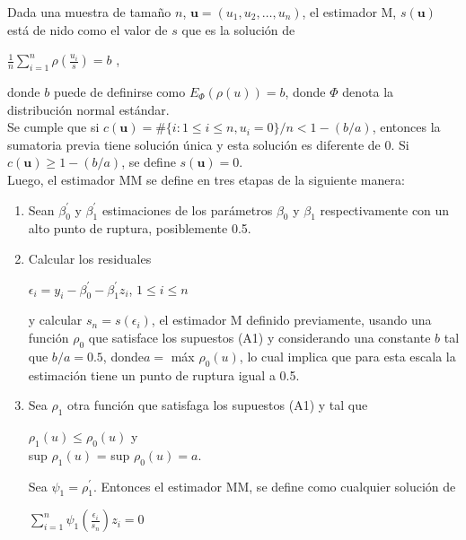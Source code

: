 Dada una muestra de tamaño $n$, $ \mathbf{u} = (u_{1}, u_{2}, \dots , u_{n})$,  el estimador M, $s(\mathbf{u})$ está de nido como el valor de $s$ que es la solución de\\

\begin{center}
	{\Large	$\frac{1}{n} \sum_{i=1}^{n} \rho( \frac{u_{i}}{s}) = b$ },\\
\end{center}

donde $b$ puede de definirse como $E_{\Phi}(\rho(u)) = b$, donde $\Phi$ denota la distribución normal estándar.\\

Se cumple que si $c(\mathbf{u}) = \#\{i : 1 \leq i \leq n, u_{i}=0\} / n < 1- (b/a) $, entonces la sumatoria previa tiene solución única y esta solución es diferente de 0. Si $c(\mathbf{u}) \geq 1 -  (b/a)$, se define $s(\mathbf{u}) = 0$. \\

Luego, el estimador MM se define en tres etapas de la siguiente manera:\\

\begin{enumerate}
	\item Sean $ \beta_{0}^{'}$ y $ \beta_{1}^{'}$ estimaciones de los parámetros $\beta_{0}$ y $ \beta_{1}$ respectivamente con un alto punto de ruptura, posiblemente 0.5.
	\item  Calcular los residuales\\
	\begin{center}
		 $ \epsilon_{i} = y_{i} -\beta_{0}^{'} -\beta_{1}^{'} z_{i}  $, $1 \leq i \leq n $\\
	\end{center}
	
	y calcular $s_{n} = s(\epsilon_{i})$, el estimador M definido previamente, usando una función $\rho_{0}$ que satisface los supuestos (A1) y considerando una constante $b$ tal que $b/a = 0.5$, donde$ a = $ máx $ \rho_{0}(u)$, lo cual implica que para esta escala la estimación tiene un
	punto de ruptura igual a 0.5.
	
	\item  Sea $\rho_{1}$ otra función que satisfaga los supuestos (A1) y tal que\\
	\begin{center}
		$\rho_{1}(u) \leq \rho_{0}(u)$ y\\
		sup $\rho_{1}(u)$  = sup $ \rho_{0}(u) = a$.\\
	\end{center}

	
	Sea $\psi_{1} = \rho_{1}^{'}$. Entonces el estimador MM, se define como cualquier solución de\\
	\begin{center}
	{\large	$\sum_{i=1}^{n} \psi_{1} (\frac{\epsilon_{i}}{s_{n}}) z_{i} = 0$}\\
	\end{center}

\end{enumerate}



